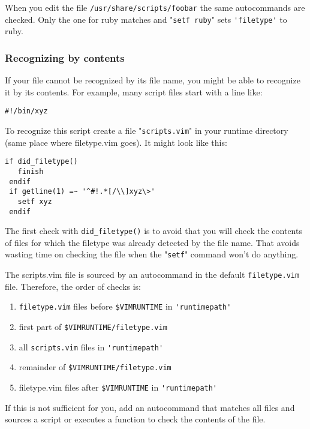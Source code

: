 When you edit the file \verb!/usr/share/scripts/foobar! the same autocommands are checked.
Only the one for ruby matches and "\verb!setf ruby!" sets \verb!'filetype'! to ruby.

\subsubsection{Recognizing by contents}
If your file cannot be recognized by its file name, you might be able to recognize it by its contents.
For example, many script files start with a line like:

\begin{Verbatim}[samepage=true]
    #!/bin/xyz 
\end{Verbatim}

To recognize this script create a file "\verb!scripts.vim!" in your runtime directory (same place where filetype.vim goes).
It might look like this:

\begin{Verbatim}[samepage=true]
 if did_filetype()
   finish
 endif
 if getline(1) =~ '^#!.*[/\\]xyz\>'
   setf xyz
 endif
\end{Verbatim}

The first check with \verb!did_filetype()! is to avoid that you will check the contents of files for which the filetype was already detected by the file name.
That avoids wasting time on checking the file when the "\verb!setf!" command won't do anything.

The scripts.vim file is sourced by an autocommand in the default \verb!filetype.vim! file.
Therefore, the order of checks is:

\begin{enumerate}
				\item \verb!filetype.vim! files before \verb!$VIMRUNTIME! in \verb!'runtimepath'!
				\item first part of \verb!$VIMRUNTIME/filetype.vim!
				\item all \verb!scripts.vim! files in \verb!'runtimepath'!
				\item remainder of \verb!$VIMRUNTIME/filetype.vim!
				\item filetype.vim files after \verb!$VIMRUNTIME! in \verb!'runtimepath'!
\end{enumerate}

If this is not sufficient for you, add an autocommand that matches all files and sources a script or executes a function to check the contents of the file.
\clearpage
